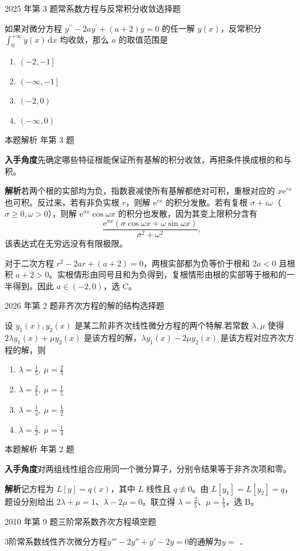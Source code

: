 \documentclass[UTF8,zihao=-4,fontset=fandol]{ctexart}
\newcommand{\blank}{\underline{\hspace{5em}}}
\newenvironment{abcd}{\begin{enumerate}[label=\textup{(\Alph*)},leftmargin=2.3em,itemsep=1pt,topsep=4pt,parsep=1pt]}{\end{enumerate}}
\newcommand{\choices}[4]{%
  \begin{abcd}
    \item #1
    \item #2
    \item #3
    \item #4
  \end{abcd}}
\newcommand{\QuestionPage}[6]{%
  \par\noindent\begin{minipage}{\linewidth}
  \raggedright
  {\small\textcolor{black!60}{#3\quad #5}\hfill\textcolor{accent}{#2}}\par\smallskip}
\newcommand{\QuestionEnd}{\end{minipage}\par\medskip}
\newcommand{\QuestionPage}[6]{%
  \clearpage
  {\small\textcolor{accent}{#1\hfill #2}}\par\medskip
  {\small\textcolor{black!60}{#3\quad #5\hfill #6}}\par\vspace{9bp}}
\newcommand{\QuestionEnd}{}
\newenvironment{QuestionSolution}[1]{%
  \clearpage
  {\small\textcolor{black!60}{本题解析\quad #1}}\par\medskip
}{\par\clearpage}
\begin{document}
\QuestionPage{4.2 高阶线性微分方程}{选择题}{2025 年第 3 题}{1}{常系数方程与反常积分收敛}{223 / 234}
如果对微分方程 \(y^{\prime\prime} - 2a y^{\prime} + \left( a + 2 \right) y = 0\) 的任一解 \(y\left( x \right)\)，反常积分 \(\int_{0}^{+\infty} y\left( x \right) \,\mathrm{d} x\) 均收敛，那么 \(a\) 的取值范围是
\choices{\(\left( -2, -1 \right]\)}{\(\left( -\infty, -1 \right]\)}{\(\left( -2, 0 \right)\)}{\(\left( -\infty, 0 \right)\)}
\QuestionEnd

\begin{QuestionSolution}{2025 年第 3 题}
\textbf{入手角度}\quad 先确定哪些特征根能保证所有基解的积分收敛，再把条件换成根的和与积。

\textbf{解析}\quad 若两个根的实部均为负，指数衰减使所有基解都绝对可积，重根对应的 \(x\mathrm{e}^{rx}\) 也可积。反过来，若有非负实根 \(r\)，则解 \(\mathrm{e}^{rx}\) 的积分发散。若有复根 \(\sigma+i\omega\)（\(\sigma\ge0,\omega>0\)），则解 \(\mathrm{e}^{\sigma x}\cos\omega x\) 的积分也发散，因为其变上限积分含有
\[
\frac{\mathrm{e}^{\sigma x}(\sigma\cos\omega x+\omega\sin\omega x)}
{\sigma^2+\omega^2},
\]
该表达式在无穷远没有有限极限。

对于二次方程 \(r^2-2ar+(a+2)=0\)，两根实部都为负等价于根和 \(2a<0\) 且根积 \(a+2>0\)。实根情形由同号且和为负得到，复根情形由根的实部等于根和的一半得到。因此 \(a\in(-2,0)\)，选 C。
\end{QuestionSolution}

\QuestionPage{4.2 高阶线性微分方程}{选择题}{2026 年第 2 题}{1}{非齐次方程的解的结构}{224 / 234}
设 \(y_1(x),y_2(x)\) 是某二阶非齐次线性微分方程的两个特解.若常数 \(\lambda,\mu\) 使得 \(2\lambda y_1(x)+\mu y_2(x)\) 是该方程的解，\(\lambda y_1(x)-2\mu y_2(x)\) 是该方程对应齐次方程的解，则
\choices{\(\lambda=\frac15,\ \mu=\frac25\)}{\(\lambda=\frac25,\ \mu=\frac15\)}{\(\lambda=\frac14,\ \mu=\frac12\)}{\(\lambda=\frac12,\ \mu=\frac14\)}
\QuestionEnd

\begin{QuestionSolution}{2026 年第 2 题}
\textbf{入手角度}\quad 对两组线性组合应用同一个微分算子，分别令结果等于非齐次项和零。

\textbf{解析}\quad 记方程为 \(L[y]=q(x)\)，其中 \(L\) 线性且 \(q\not\equiv0\)。由 \(L[y_1]=L[y_2]=q\)，题设分别给出 \(2\lambda+\mu=1\)、\(\lambda-2\mu=0\)。联立得 \(\lambda=\frac{2}{5}\)、\(\mu=\frac{1}{5}\)，选 B。
\end{QuestionSolution}

\QuestionPage{4.2 高阶线性微分方程}{填空题}{2010 年第 9 题}{2}{三阶常系数齐次方程}{225 / 234}
$3$阶常系数线性齐次微分方程$y''' - 2y'' + y' - 2y = 0$的通解为$y =$ \blank{}．
\QuestionEnd
\end{document}
